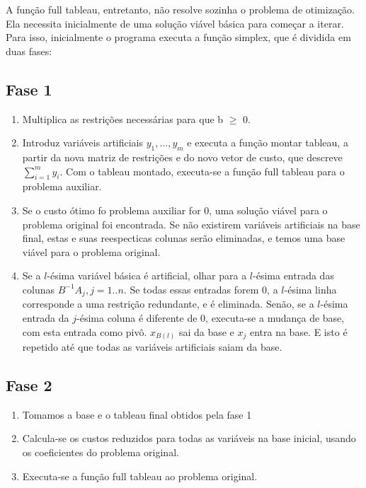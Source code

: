 \documentclass[brazil,times]{abnt}
\begin{document}
A função full tableau, entretanto, não resolve sozinha o problema de otimização. Ela necessita inicialmente de uma solução viável básica para começar a iterar. Para isso, inicialmente o programa executa a função simplex, que é dividida em duas fases:

\subsection*{Fase 1}

\begin{enumerate}
	\item Multiplica as restrições necessárias para que b $\geq$ 0.
	\item Introduz variáveis artificiais $y_1, ... , y_m$ e executa a função montar tableau, a partir da nova matriz de restrições e do novo vetor de custo, que descreve  $\sum_{i=1}^m y_i$. Com o tableau montado, executa-se a função full tableau para o problema auxiliar.
	\item Se o custo ótimo fo problema auxiliar for 0, uma solução viável para o problema original foi encontrada. Se não existirem variáveis artificiais na base final, estas e suas reespecticas colunas serão eliminadas, e temos uma base viável para o problema original.
	\item Se a $l$-ésima variável básica é artificial, olhar para a $l$-ésima entrada das colunas $B^{-1}A_j, j = 1..n$. Se todas essas entradas forem 0, a $l$-ésima linha corresponde a uma restrição redundante, e é eliminada. Senão, se a $l$-ésima entrada da $j$-ésima coluna é diferente de 0, executa-se a mudança de base, com esta entrada como pivô. $x_{B(l)}$ sai da base e $x_j$ entra na base. E isto é repetido até que todas as variáveis artificiais saiam da base.
\end{enumerate}

\subsection*{Fase 2}
\begin{enumerate}
	\item Tomamos a base e o tableau final obtidos pela fase 1
	\item Calcula-se os custos reduzidos para todas as variáveis na base inicial, usando os coeficientes do problema original.
	\item Executa-se a função full tableau ao problema original.
\end{enumerate}
\end{document}
